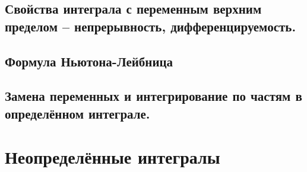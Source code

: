 \documentclass{article}
\begin{document}
\newpage
\subsection{Свойства интеграла с переменным верхним пределом -- непрерывность, дифференцируемость.}

\newpage
\subsection{Формула Ньютона-Лейбница}

\newpage
\subsection{Замена переменных и интегрирование по частям в определённом интеграле.}

\newpage
\section{Неопределённые интегралы}
\end{document}
